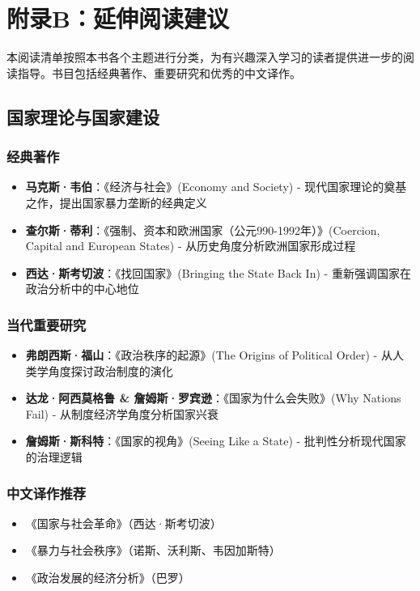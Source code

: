 \chapter{附录B：延伸阅读建议}

本阅读清单按照本书各个主题进行分类，为有兴趣深入学习的读者提供进一步的阅读指导。书目包括经典著作、重要研究和优秀的中文译作。

\section{国家理论与国家建设}

\subsection{经典著作}
\begin{itemize}
    \item \textbf{马克斯·韦伯}：《经济与社会》(Economy and Society)
    \quad - 现代国家理论的奠基之作，提出国家暴力垄断的经典定义
    \item \textbf{查尔斯·蒂利}：《强制、资本和欧洲国家（公元990-1992年）》(Coercion, Capital and European States)
    \quad - 从历史角度分析欧洲国家形成过程
    \item \textbf{西达·斯考切波}：《找回国家》(Bringing the State Back In)
    \quad - 重新强调国家在政治分析中的中心地位
\end{itemize}

\subsection{当代重要研究}
\begin{itemize}
    \item \textbf{弗朗西斯·福山}：《政治秩序的起源》(The Origins of Political Order)
    \quad - 从人类学角度探讨政治制度的演化
    \item \textbf{达龙·阿西莫格鲁 \& 詹姆斯·罗宾逊}：《国家为什么会失败》(Why Nations Fail)
    \quad - 从制度经济学角度分析国家兴衰
    \item \textbf{詹姆斯·斯科特}：《国家的视角》(Seeing Like a State)
    \quad - 批判性分析现代国家的治理逻辑
\end{itemize}

\subsection{中文译作推荐}
\begin{itemize}
    \item 《国家与社会革命》（西达·斯考切波）
    \item 《暴力与社会秩序》（诺斯、沃利斯、韦因加斯特）
    \item 《政治发展的经济分析》（巴罗）
\end{itemize}

